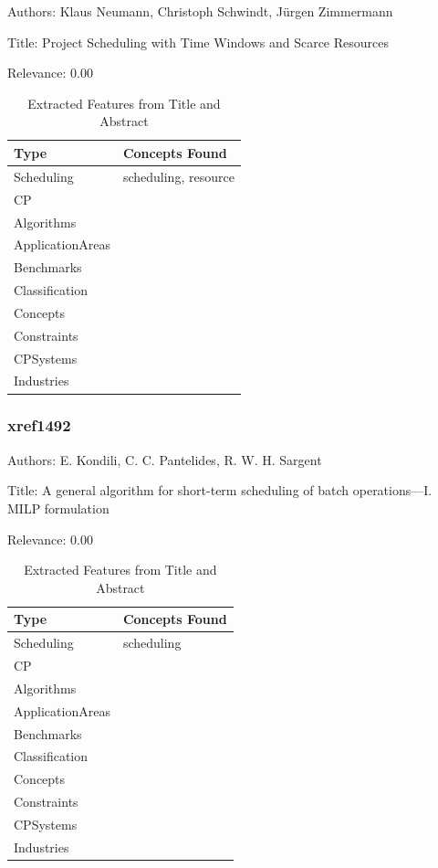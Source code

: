 Authors: Klaus Neumann, Christoph Schwindt, Jürgen Zimmermann

Title: Project Scheduling with Time Windows and Scarce Resources

Relevance:  0.00

{\scriptsize
\begin{longtable}{p{2cm}p{20cm}}
\caption{Extracted Features from Title and Abstract}\\ \toprule
Type & Concepts Found\\ \midrule
\endhead
\bottomrule
\endfoot
Scheduling & scheduling, resource\\ 
CP & \\ 
Algorithms & \\ 
ApplicationAreas & \\ 
Benchmarks & \\ 
Classification & \\ 
Concepts & \\ 
Constraints & \\ 
CPSystems & \\ 
Industries & \\ 
\end{longtable}
}



\subsubsection{xref1492}
\label{mw:xref1492}

Authors: E. Kondili, C. C. Pantelides, R. W. H. Sargent

Title: A general algorithm for short-term scheduling of batch operations—I. MILP formulation

Relevance:  0.00

{\scriptsize
\begin{longtable}{p{2cm}p{20cm}}
\caption{Extracted Features from Title and Abstract}\\ \toprule
Type & Concepts Found\\ \midrule
\endhead
\bottomrule
\endfoot
Scheduling & scheduling\\ 
CP & \\ 
Algorithms & \\ 
ApplicationAreas & \\ 
Benchmarks & \\ 
Classification & \\ 
Concepts & \\ 
Constraints & \\ 
CPSystems & \\ 
Industries & \\ 
\end{longtable}
}



